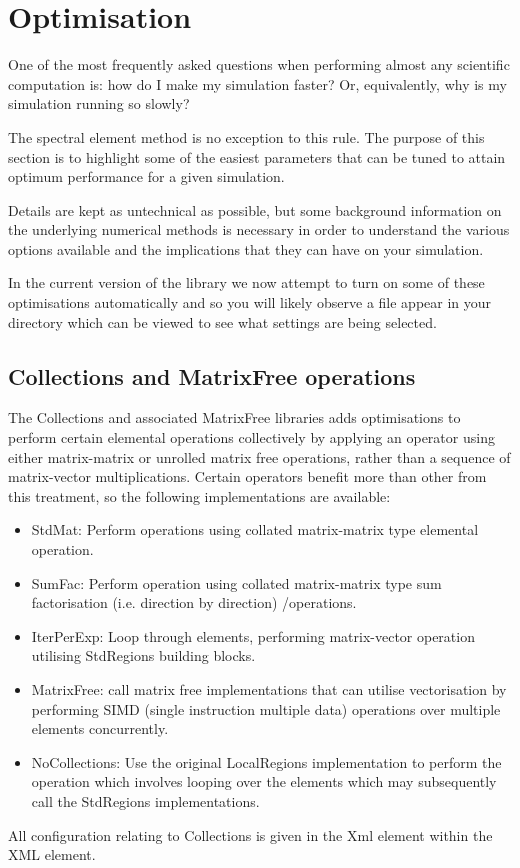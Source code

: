 \chapter{Optimisation}

One of the most frequently asked questions when performing almost any scientific
computation is: how do I make my simulation faster? Or, equivalently, why is my
simulation running so slowly?

The spectral element method is no exception to this rule. The purpose of this
section is to highlight some of the easiest parameters that can be tuned to
attain optimum performance for a given simulation.

Details are kept as untechnical as possible, but some background information on
the underlying numerical methods is necessary in order to understand the various
options available and the implications that they can have on your simulation.

In the current version of the library we now attempt to turn on some
of these optimisations automatically and so you will likely observe a
 file appear in your directory which can be viewed to see
what settings are being selected.

\section{Collections and MatrixFree operations}
The Collections and associated MatrixFree libraries adds optimisations
to perform certain elemental operations collectively by applying an
operator using either matrix-matrix or unrolled matrix free operations,
rather than a sequence of matrix-vector multiplications. Certain
operators benefit more than other from this treatment, so the
following implementations are available:
\begin{itemize}
    \item StdMat: Perform operations using collated matrix-matrix type
      elemental operation.
    \item SumFac: Perform operation using collated matrix-matrix type sum
        factorisation (i.e. direction by direction) /operations.
    \item IterPerExp: Loop through elements, performing matrix-vector
      operation utilising StdRegions building blocks.
     \item MatrixFree: call matrix free implementations that can
       utilise vectorisation by performing SIMD (single instruction
       multiple data) operations over multiple elements concurrently.
    \item NoCollections: Use the original LocalRegions implementation
      to perform the operation which involves looping over the
      elements which may subsequently call the StdRegions
      implementations.
\end{itemize}
All configuration relating to Collections is given in the 
Xml element within the  XML element.

